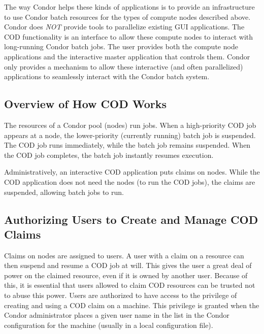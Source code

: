 The way Condor helps these kinds of applications is to provide an
infrastructure to use Condor batch resources for the types of compute
nodes described above.
Condor does \emph{NOT} provide tools to parallelize existing GUI
applications.
The COD functionality is an interface to allow these compute nodes to
interact with long-running Condor batch jobs.
The user provides both the compute node applications and the
interactive master application that controls them.
Condor only provides a mechanism to allow these interactive (and often
parallelized) applications to seamlessly interact with the Condor
batch system.


\subsection{\label{sec:cod-overview}
Overview of How COD Works}

The resources of a Condor pool (nodes)
run jobs.
When a high-priority COD job appears at a node,
the lower-priority (currently running) batch job is
suspended.
The COD job runs immediately, while the batch job remains suspended.
When the COD job completes, the batch job instantly resumes execution.

Administratively,
an interactive COD application puts claims on nodes.
While the COD application does not need the nodes (to run the
COD jobs),  the claims are suspended, allowing batch jobs to run.


\subsection{\label{sec:cod-authorizing}
Authorizing Users to Create and Manage COD Claims}

Claims on nodes are assigned to users.
A user with a claim on a resource can then suspend and
resume a COD job at will.
This gives the user a great deal of power on the claimed resource,
even if it is owned by another user.
Because of this, it is essential that users allowed to claim
COD resources can be
trusted not to abuse this power.
Users are authorized to have access to the privilege
of creating and using a COD claim on a machine.
This privilege is granted when the Condor administrator places a given
user name in the  list in the Condor
configuration for the machine (usually in a local configuration file).

